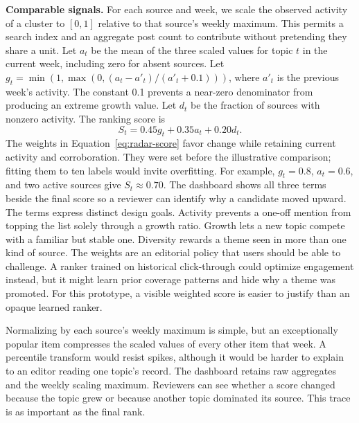 \documentclass[../../proceedings/main.tex]{subfiles}
\begin{document}
\begin{refsection}
\textbf{Comparable signals.} For each source and week, we scale the observed
activity of a cluster to $[0,1]$ relative to that source's weekly maximum.
This permits a search index and an aggregate post count to contribute without
pretending they share a unit. Let $a_t$ be the mean of the three scaled values
for topic $t$ in the current week, including zero for absent sources. Let
$g_t=\min(1,\max(0,(a_t-a'_t)/(a'_t+0.1)))$, where $a'_t$ is the previous
week's activity. The constant 0.1 prevents a near-zero denominator from
producing an extreme growth value. Let $d_t$ be the fraction of sources with
nonzero activity. The ranking score is
\begin{equation}
  S_t=0.45g_t+0.35a_t+0.20d_t.
  \label{eq:radar-score}
\end{equation}
The weights in Equation~\ref{eq:radar-score} favor change while retaining
current activity and corroboration. They were set before the illustrative
comparison; fitting them to ten labels would invite overfitting. For example,
$g_t=0.8$, $a_t=0.6$, and two active sources give $S_t\approx0.70$. The
dashboard shows all three terms beside the final score so a reviewer can
identify why a candidate moved upward.
The terms express distinct design goals. Activity prevents a one-off mention
from topping the list solely through a growth ratio. Growth lets a new topic
compete with a familiar but stable one. Diversity rewards a theme seen in
more than one kind of source. The weights are an editorial policy that users
should be able to challenge. A ranker trained on historical click-through
could optimize engagement instead, but it might learn prior coverage patterns
and hide why a theme was promoted. For this prototype, a visible weighted
score is easier to justify than an opaque learned ranker.

Normalizing by each source's weekly maximum is simple, but an exceptionally
popular item compresses the scaled values of every other item that week. A
percentile transform would resist spikes, although it would be harder to
explain to an editor reading one topic's record. The dashboard retains raw
aggregates and the weekly scaling maximum. Reviewers can see whether a score
changed because the topic grew or because another topic dominated its source.
This trace is as important as the final rank.


\end{refsection}
\end{document}
